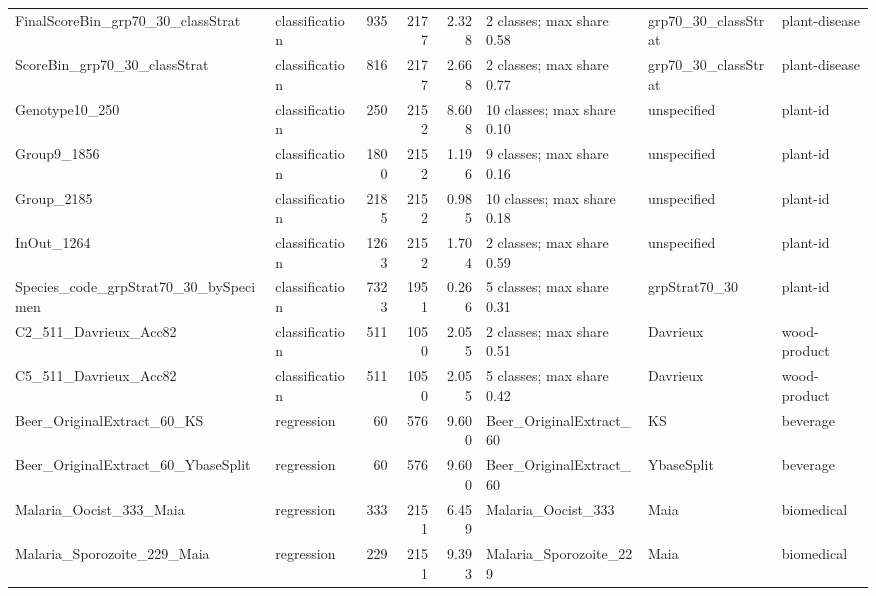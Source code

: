 \begin{landscape}
\begin{longtable}{L{6.2cm}L{2.1cm}rrrL{6.0cm}L{2.6cm}L{3.0cm}}
FinalScoreBin\_\allowbreak{}grp70\_\allowbreak{}30\_\allowbreak{}classStrat & classification & 935 & 2177 & 2.328 & 2 classes; max share 0.58 & grp70\_\allowbreak{}30\_\allowbreak{}classStrat & plant-\allowbreak{}disease \\
ScoreBin\_\allowbreak{}grp70\_\allowbreak{}30\_\allowbreak{}classStrat & classification & 816 & 2177 & 2.668 & 2 classes; max share 0.77 & grp70\_\allowbreak{}30\_\allowbreak{}classStrat & plant-\allowbreak{}disease \\
Genotype10\_\allowbreak{}250 & classification & 250 & 2152 & 8.608 & 10 classes; max share 0.10 & unspecified & plant-\allowbreak{}id \\
Group9\_\allowbreak{}1856 & classification & 1800 & 2152 & 1.196 & 9 classes; max share 0.16 & unspecified & plant-\allowbreak{}id \\
Group\_\allowbreak{}2185 & classification & 2185 & 2152 & 0.985 & 10 classes; max share 0.18 & unspecified & plant-\allowbreak{}id \\
InOut\_\allowbreak{}1264 & classification & 1263 & 2152 & 1.704 & 2 classes; max share 0.59 & unspecified & plant-\allowbreak{}id \\
Species\_\allowbreak{}code\_\allowbreak{}grpStrat70\_\allowbreak{}30\_\allowbreak{}bySpecimen & classification & 7323 & 1951 & 0.266 & 5 classes; max share 0.31 & grpStrat70\_\allowbreak{}30 & plant-\allowbreak{}id \\
C2\_\allowbreak{}511\_\allowbreak{}Davrieux\_\allowbreak{}Acc82 & classification & 511 & 1050 & 2.055 & 2 classes; max share 0.51 & Davrieux & wood-\allowbreak{}product \\
C5\_\allowbreak{}511\_\allowbreak{}Davrieux\_\allowbreak{}Acc82 & classification & 511 & 1050 & 2.055 & 5 classes; max share 0.42 & Davrieux & wood-\allowbreak{}product \\
Beer\_\allowbreak{}OriginalExtract\_\allowbreak{}60\_\allowbreak{}KS & regression & 60 & 576 & 9.600 & Beer\_\allowbreak{}OriginalExtract\_\allowbreak{}60 & KS & beverage \\
Beer\_\allowbreak{}OriginalExtract\_\allowbreak{}60\_\allowbreak{}YbaseSplit & regression & 60 & 576 & 9.600 & Beer\_\allowbreak{}OriginalExtract\_\allowbreak{}60 & YbaseSplit & beverage \\
Malaria\_\allowbreak{}Oocist\_\allowbreak{}333\_\allowbreak{}Maia & regression & 333 & 2151 & 6.459 & Malaria\_\allowbreak{}Oocist\_\allowbreak{}333 & Maia & biomedical \\
Malaria\_\allowbreak{}Sporozoite\_\allowbreak{}229\_\allowbreak{}Maia & regression & 229 & 2151 & 9.393 & Malaria\_\allowbreak{}Sporozoite\_\allowbreak{}229 & Maia & biomedical \\

\end{longtable}
\end{landscape}
